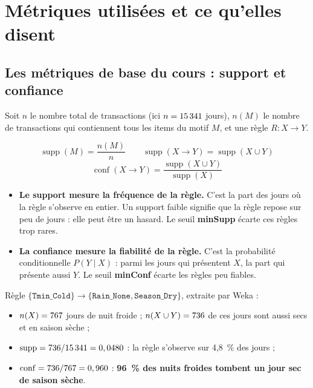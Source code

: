 \documentclass[12pt, a4paper]{article}
\newcommand{\itm}[1]{\texttt{#1}}
\begin{document}
\section{Métriques utilisées et ce qu'elles disent}
\label{sec:metriques}

\subsection{Les métriques de base du cours : support et confiance}

Soit $n$ le nombre total de transactions (ici $n = 15\,341$ jours), $n(M)$ le nombre de
transactions qui contiennent tous les items du motif $M$, et une règle $R : X \rightarrow Y$.

\begin{formule}
\[
\operatorname{supp}(M) = \frac{n(M)}{n}
\qquad
\operatorname{supp}(X \rightarrow Y) = \operatorname{supp}(X \cup Y)
\]
\[
\operatorname{conf}(X \rightarrow Y) = \frac{\operatorname{supp}(X \cup Y)}{\operatorname{supp}(X)}
\]
\end{formule}

\begin{itemize}
  \item \textbf{Le support mesure la fréquence de la règle.} C'est la part des jours où la
        règle s'observe en entier. Un support faible signifie que la règle repose sur peu de jours :
        elle peut être un hasard. Le seuil \textbf{minSupp} écarte ces règles trop rares.
  \item \textbf{La confiance mesure la fiabilité de la règle.} C'est la probabilité
        conditionnelle $P(Y \mid X)$ : parmi les jours qui présentent $X$, la part qui présente
        aussi $Y$. Le seuil \textbf{minConf} écarte les règles peu fiables.
\end{itemize}

\begin{reponse}
Règle $\{\itm{Tmin\_Cold}\} \rightarrow \{\itm{Rain\_None}, \itm{Season\_Dry}\}$, extraite
par Weka :
\begin{itemize}
  \item $n(X) = 767$ jours de nuit froide ; $n(X \cup Y) = 736$ de ces jours sont aussi
        secs et en saison sèche ;
  \item $\operatorname{supp} = 736 / 15\,341 = 0,0480$ : la règle s'observe sur 4,8~\% des
        jours ;
  \item $\operatorname{conf} = 736 / 767 = 0,960$ : \textbf{96~\% des nuits froides
        tombent un jour sec de saison sèche}.
\end{itemize}
\end{reponse}
\end{document}
